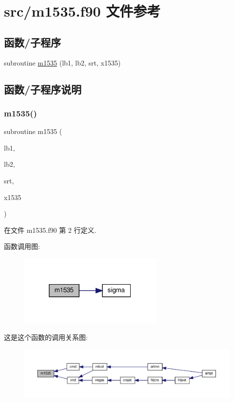 \hypertarget{m1535_8f90}{}\section{src/m1535.f90 文件参考}
\label{m1535_8f90}
\subsection*{函数/子程序}
\begin{DoxyCompactItemize}
\item 
subroutine \mbox{\hyperlink{m1535_8f90_aa1698a407aaa26f67eecb38133d8969a}{m1535}} (lb1, lb2, srt, x1535)
\end{DoxyCompactItemize}


\subsection{函数/子程序说明}
\mbox{\label{m1535_8f90_aa1698a407aaa26f67eecb38133d8969a}} 
\subsubsection{\texorpdfstring{m1535()}{m1535()}}
{\footnotesize\ttfamily subroutine m1535 (\begin{DoxyParamCaption}\item[{}]{lb1,  }\item[{}]{lb2,  }\item[{}]{srt,  }\item[{}]{x1535 }\end{DoxyParamCaption})}



在文件 m1535.\+f90 第 2 行定义.

函数调用图\+:
\nopagebreak
\begin{figure}[H]
\begin{center}
\leavevmode
\includegraphics[width=205pt]{m1535_8f90_aa1698a407aaa26f67eecb38133d8969a_cgraph}
\end{center}
\end{figure}
这是这个函数的调用关系图\+:
\nopagebreak
\begin{figure}[H]
\begin{center}
\leavevmode
\includegraphics[width=350pt]{m1535_8f90_aa1698a407aaa26f67eecb38133d8969a_icgraph}
\end{center}
\end{figure}
